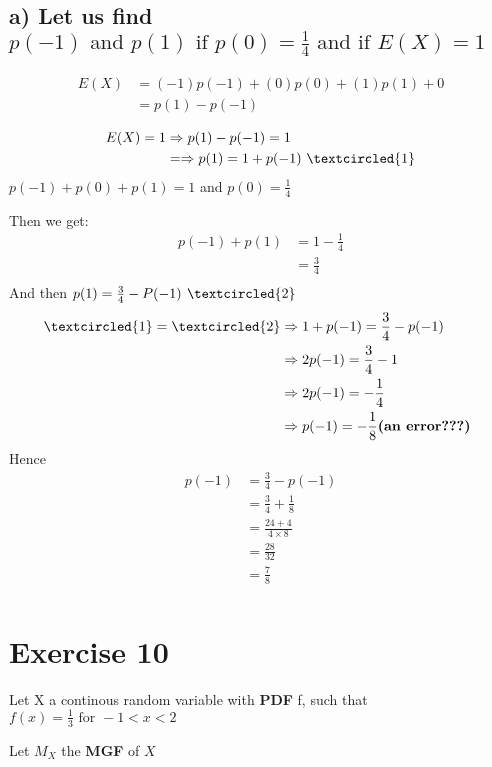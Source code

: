 \documentclass[11pt]{article}
\def\lt{<}
\begin{document}
   \subsection{a) Let us find $p(-1)\text{ and } p(1) \text{ if } p(0)=\frac{1}{4} \text{ and if } E(X)= 1$}
   
\begin{align*}
  E(X) &= (-1)p(-1)+(0)p(0)+(1)p(1)+0 \\
       &=p(1)-p(-1) \\       
\end{align*} 
\begin{align*}
  E(X)= 1 & \Rightarrow p(1)-p(-1)= 1\\
       &=\Rightarrow p(1)=1+p(-1) \text{ } \textcircled{1}      
\end{align*}
$p(-1)+p(0)+p(1)=1$ and $ p(0)=\frac{1}{4}$

Then we get:
\begin{align*}
  p(-1)+p(1) &=  1-\frac{1}{4}\\ 
 			 &= \frac{3}{4}\\    
\end{align*}
And then $p(1)=\frac{3}{4}-P(-1) \textbf{ } \textcircled{2} $
\begin{align*}
  \textcircled{1} = \textcircled{2} & \Rightarrow  1+p(-1)=\frac{3}{4}-p(-1)\\ 
 			 &\Rightarrow 2p(-1)=\frac{3}{4}-1\\
 			 &\Rightarrow 2p(-1)=-\frac{1}{4}\\  
 			 &\Rightarrow p(-1)=-\frac{1}{8} \textbf{(an error???)        }    
\end{align*}
Hence
\begin{align*}
p(-1)&=\frac{3}{4}-p(-1)\\
	 &=\frac{3}{4}+\frac{1}{8}\\
	 &=\frac{24+4}{4\times 8}\\
	 &=\frac{28}{32}\\
	 &=\frac{7}{8}\\
\end{align*}
  
   
\newpage 
    \section{Exercise 10}
   
   Let X a continous random variable with \textbf{PDF} f, such that $f(x)=\frac{1}{3} \text{ for } -1 \lt x \lt 2$
   
   
   Let $M_X$ the \textbf{MGF} of $X$
   
\end{document}
